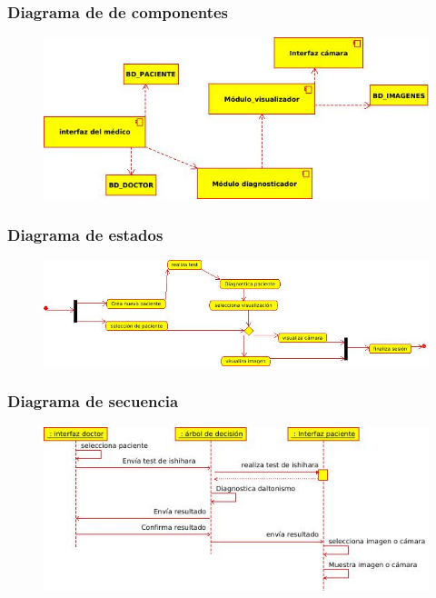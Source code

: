 \documentclass[10pt]{article}
\begin{document}
\subsubsection{Diagrama de de componentes}


\begin{figure}[H]
	\begin{center}
\includegraphics[scale = 0.85]{UML/componentes.jpeg}
	\end{center} 
\end{figure}
\subsubsection{Diagrama de estados}


\begin{figure}[H]
	\begin{center}
\includegraphics[scale = 0.80]{UML/estados.jpeg}
	\end{center} 
\end{figure}
\subsubsection{Diagrama de secuencia}


\begin{figure}[H]
	\begin{center}
\includegraphics[scale = 1.10]{UML/secuencia.jpeg}
	\end{center} 
\end{figure}
\end{document}
